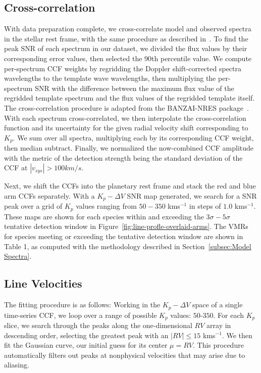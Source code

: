 \documentclass[twocolumn]{aastex631}
\begin{document}
        \subsection{Cross-correlation}
            With data preparation complete, we cross-correlate model and observed spectra in the stellar rest frame, with the same procedure as described in~\citet{Johnson2023}. To find the peak SNR of each spectrum in our dataset, we divided the flux values by their corresponding error values, then selected the 90th percentile value. We compute per-spectrum CCF weights by regridding the Doppler shift-corrected spectra wavelengths to the template wave wavelengths, then multiplying the per-spectrum SNR with the difference between the maximum flux value of the regridded template spectrum and the flux values of the regridded template itself. The cross-correlation procedure is adapted from the BANZAI-NRES package~\citep{McCully2022}. With each spectrum cross-correlated, we then interpolate the cross-correlation function and its uncertainty for the given radial velocity shift corresponding to $K_p$. We sum over all spectra, multiplying each by its corresponding CCF weight, then median subtract. Finally, we normalized the now-combined CCF amplitude with the metric of the detection strength being the standard deviation of the CCF at $|v_{sys}| > 100 km/s$.
            
            Next, we shift the CCFs into the planetary rest frame and stack the red and blue arm CCFs separately. With a ${K_p-\Delta\!V}$ SNR map generated, we search for a SNR peak over a grid of $K_p$ values ranging from $50-350$ kms$^{-1}$ in steps of $1.0$ kms$^{-1}$. These maps are shown for each species within and exceeding the ${3\sigma}-{5\sigma}$ tentative detection window in Figure~\ref{fig:line-profle-overlaid-arms}. The VMRs for species meeting or exceeding the tentative detection window are shown in Table 1, as computed with the methodology described in Section~\ref{subsec:Model Spectra}.

        \subsection{Line Velocities}\label{subsec:Line Velocities}
            The fitting procedure is as follows: Working in the ${K_p-\Delta\!V}$ space of a single time-series CCF, we loop over a range of possible $K_p$ values: $50$-$350$. For each $K_p$ slice, we search through the peaks along the one-dimensional $RV$ array in descending order, selecting the greatest peak with an $|RV| \leq 15$ kms$^{-1}$. We then fit the Gaussian curve, our initial guess for its center $\mu = RV$. This procedure automatically filters out peaks at nonphysical velocities that may arise due to aliasing.
            
\end{document}
